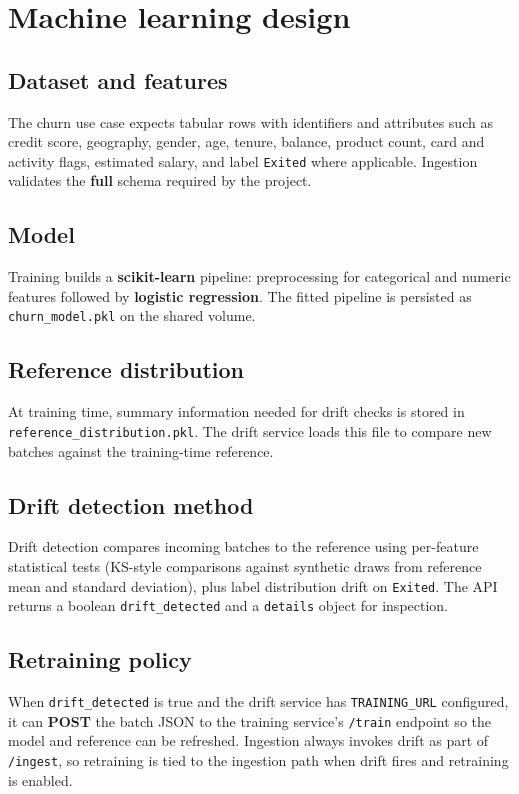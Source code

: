 \documentclass[11pt,a4paper,oneside]{report}
\begin{document}
\chapter{Machine learning design}
\label{ch:ml}

\section{Dataset and features}
The churn use case expects tabular rows with identifiers and attributes such as credit score, geography, gender, age, tenure, balance, product count, card and activity flags, estimated salary, and label \texttt{Exited} where applicable. Ingestion validates the \textbf{full} schema required by the project.

\section{Model}
Training builds a \textbf{scikit-learn} pipeline: preprocessing for categorical and numeric features followed by \textbf{logistic regression}. The fitted pipeline is persisted as \texttt{churn\_model.pkl} on the shared volume.

\section{Reference distribution}
At training time, summary information needed for drift checks is stored in \texttt{reference\_distribution.pkl}. The drift service loads this file to compare new batches against the training-time reference.

\section{Drift detection method}
Drift detection compares incoming batches to the reference using per-feature statistical tests (KS-style comparisons against synthetic draws from reference mean and standard deviation), plus label distribution drift on \texttt{Exited}. The API returns a boolean \texttt{drift\_detected} and a \texttt{details} object for inspection.

\section{Retraining policy}
When \texttt{drift\_detected} is true and the drift service has \texttt{TRAINING\_URL} configured, it can \textbf{POST} the batch JSON to the training service's \texttt{/train} endpoint so the model and reference can be refreshed. Ingestion always invokes drift as part of \texttt{/ingest}, so retraining is tied to the ingestion path when drift fires and retraining is enabled.
\end{document}
